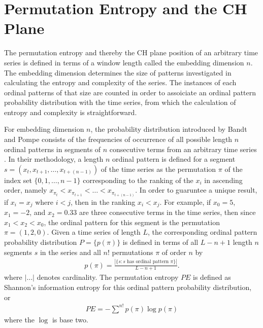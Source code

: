 \documentclass[aps,twocolumn,secnumarabic,nobalancelastpage,amsmath,amssymb,
nofootinbib]{revtex4-1}
\begin{document}

\section{Permutation Entropy and the CH Plane}
The permutation entropy and thereby the CH plane position of an arbitrary time series is defined in terms of a window length called the embedding dimension $n$. The embedding dimension determines the size of patterns investigated in calculating the entropy and complexity of the series. The instances of each ordinal patterns of that size are counted in order to assoiciate an ordinal pattern probability distribution with the time series, from which the calculation of entropy and complexity is straightforward.

For embedding dimension $n$, the probability distribution introduced by Bandt and Pompe consists of the frequencies of occurrence of all possible length $n$ ordinal patterns in segments of $n$ consecutive terms from an arbitrary time series \cite{bandt2002}. In their methodology, a length $n$ ordinal pattern is defined for a segment $s = ( x_t,x_{t+1},\ldots,x_{t+(n-1)} )$ of the time series as the permutation $\pi$ of the index set $\{0,1,\ldots,n-1 \}$ corresponding to the ranking of the $x_i$ in ascending order, namely $x_{\pi_t}< x_{\pi_{t+1}}<\ldots< x_{\pi_{t+(n-1)}}$. In order to guaruntee a unique result, if $x_i = x_j$ where $i<j$, then in the ranking $x_i <x_j$. For example, if $x_0 = 5$,  $x_1= -2$,  and $x_2 = 0.33$ are three consecutive terms in the time series, then since $x_1 < x_2 < x_0$, the ordinal pattern for this segment is the permutation $\pi = (1,2,0)$.  Given a time series of length $L$, the corresponding ordinal pattern probability distribution $P= \{p(\pi) \}$ is defined in terms of all $L-n+1$ length $n$ segments $s$ in the series and all $n!$ permutations $\pi$ of order $n$ by
\begin{align}
p(\pi) = \frac{|\{s: \text{$s$ has ordinal pattern $\pi$}\}| }{L-n+1}. 
\end{align}
where $|\ldots|$ denotes cardinality. The permutation entropy $PE$ is defined as Shannon's information entropy for this ordinal pattern probability distribution, or
\begin{align}
PE  = -\sum^{n!} p(\pi) \log p(\pi)
\end{align}
where the $\log$ is base two.
\end{document}
